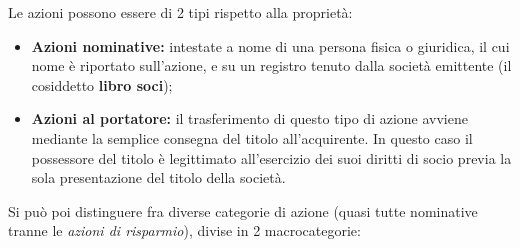 \documentclass[a4paper,11pt]{article}
\begin{document}
Le azioni possono essere di 2 tipi rispetto alla proprietà:
\begin{itemize}
	\item \textbf{Azioni nominative:} intestate a nome di una persona fisica o giuridica, il cui nome è riportato sull'azione, e su un registro tenuto dalla società emittente (il cosiddetto \textbf{libro soci});
	\item \textbf{Azioni al portatore:} il trasferimento di questo tipo di azione avviene mediante la semplice consegna del titolo all'acquirente. In questo caso il possessore del titolo è legittimato all'esercizio dei suoi diritti di socio previa la sola presentazione del titolo della società. 
\end{itemize}

Si può poi distinguere fra diverse categorie di azione (quasi tutte nominative tranne le \textit{azioni di risparmio}), divise in 2 macrocategorie:
\end{document}
